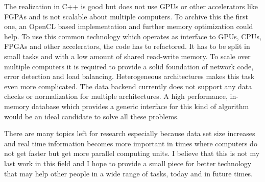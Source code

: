 The realization in C++ is good but does not use GPUs or other accelerators like FGPAs and is not scalable about multiple computers. To archive this the first one, an OpenCL based implementation and further memory optimization could help. To use this common technology which operates as interface to GPUs, CPUs, FPGAs and other accelerators, the code has to refactored. It has to be split in small tasks and with a low amount of shared read-write memory. To scale over multiple computers it is required to provide a solid foundation of network code, error detection and load balancing. Heterogeneous architectures makes this task even more complicated. The data backend currently does not support any data checks or normalization for multiple architectures. A high performance, in-memory database which provides a generic interface for this kind of algorithm would be an ideal candidate to solve all these problems.

There are many topics left for research especially because data set size increases and real time information becomes more important in times where computers do not get faster but get more parallel computing units. I believe that this is not my last work in this field and I hope to provide a small piece for better technology that may help other people in a wide range of tasks, today and in future times.
